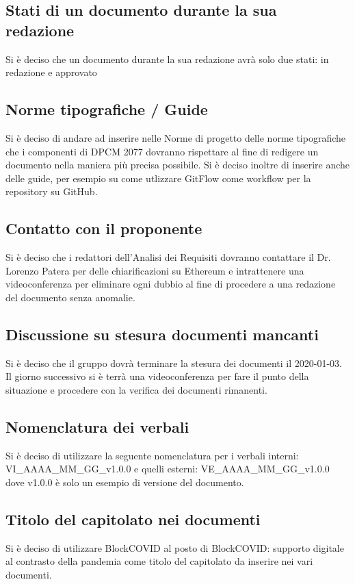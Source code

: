 \subsection*{Stati di un documento durante la sua redazione}
Si è deciso che un documento durante la sua redazione avrà solo due stati: in redazione e approvato

\subsection*{Norme tipografiche / Guide}
Si è deciso di andare ad inserire nelle Norme di progetto delle norme tipografiche che i componenti di DPCM 2077 dovranno rispettare al fine di redigere un documento nella maniera
più precisa possibile. Si è deciso inoltre di inserire anche delle guide, per esempio su come utlizzare GitFlow come workflow per la repository su GitHub.

\subsection*{Contatto con il proponente}
Si è deciso che i redattori dell'Analisi dei Requisiti dovranno contattare il Dr. Lorenzo Patera per delle chiarificazioni su Ethereum e intrattenere una videoconferenza per eliminare ogni dubbio
al fine di procedere a una redazione del documento senza anomalie.

\subsection*{Discussione su stesura documenti mancanti}
Si è deciso che il gruppo dovrà terminare la stesura dei documenti il 2020-01-03. Il giorno successivo si è terrà una videoconferenza per fare il punto della situazione e procedere con la verifica dei documenti rimanenti.

\subsection*{Nomenclatura dei verbali}
Si è deciso di utilizzare la seguente nomenclatura per i verbali interni: VI\_AAAA\_MM\_GG\_v1.0.0 e quelli esterni:  VE\_AAAA\_MM\_GG\_v1.0.0 dove v1.0.0 è solo un esempio di versione del documento.

\subsection*{Titolo del capitolato nei documenti}
Si è deciso di utilizzare BlockCOVID al posto di BlockCOVID: supporto digitale al contrasto della pandemia come titolo del capitolato da inserire nei vari documenti.

